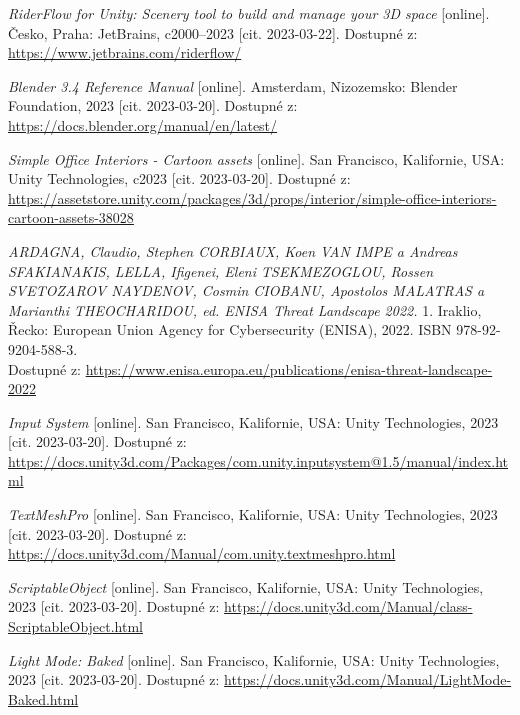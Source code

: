 \begin{flushleft}
\begin{thebibliography}{99}
\textit{RiderFlow for Unity: Scenery tool to build and manage your 3D space} [online]. Česko, Praha: JetBrains, c2000–2023 [cit. 2023-03-22]. Dostupné z: \url{https://www.jetbrains.com/riderflow/}

\textit{Blender 3.4 Reference Manual} [online]. Amsterdam, Nizozemsko: Blender Foundation, 2023 [cit. 2023-03-20]. Dostupné z: \href{https://docs.blender.org/manual/en/latest/}{https://docs.blender.org/manual/en/latest/}

\textit{Simple Office Interiors - Cartoon assets} [online]. San Francisco, Kalifornie, USA: Unity Technologies, c2023 [cit. 2023-03-20]. Dostupné z: \href{https://assetstore.unity.com/packages/3d/props/interior/simple-office-interiors-cartoon-assets-38028}{https://assetstore.unity.com/packages/3d/props/interior/simple-office-interiors-cartoon-assets-38028}

\textit{ARDAGNA, Claudio, Stephen CORBIAUX, Koen VAN IMPE a Andreas SFAKIANAKIS, LELLA, Ifigenei, Eleni TSEKMEZOGLOU, Rossen SVETOZAROV NAYDENOV, Cosmin CIOBANU, Apostolos MALATRAS a Marianthi THEOCHARIDOU, ed. ENISA Threat Landscape 2022.} 1. Iraklio, Řecko: European Union Agency for Cybersecurity (ENISA), 2022. ISBN 978-92-9204-588-3. \\Dostupné z: \href{https://www.enisa.europa.eu/publications/enisa-threat-landscape-2022}{https://www.enisa.europa.eu/publications/enisa-threat-landscape-2022}

\textit{Input System} [online]. San Francisco, Kalifornie, USA: Unity Technologies, 2023 [cit. 2023-03-20]. Dostupné z: \href{https://docs.unity3d.com/Packages/com.unity.inputsystem@1.5/manual/index.html}{https://docs.unity3d.com/Packages/com.unity.inputsystem@1.5/manual/index.html}

\textit{TextMeshPro} [online]. San Francisco, Kalifornie, USA: Unity Technologies, 2023 [cit. 2023-03-20]. Dostupné z: \href{https://docs.unity3d.com/Manual/com.unity.textmeshpro.html}{https://docs.unity3d.com/Manual/com.unity.textmeshpro.html}

\textit{ScriptableObject} [online]. San Francisco, Kalifornie, USA: Unity Technologies, 2023 [cit. 2023-03-20]. Dostupné z: \href{https://docs.unity3d.com/Manual/class-ScriptableObject.html}{https://docs.unity3d.com/Manual/class-ScriptableObject.html}

\textit{Light Mode: Baked} [online]. San Francisco, Kalifornie, USA: Unity Technologies, 2023 [cit. 2023-03-20]. Dostupné z: \href{https://docs.unity3d.com/Manual/LightMode-Baked.html}{https://docs.unity3d.com/Manual/LightMode-Baked.html}


\end{thebibliography}
\end{flushleft}
